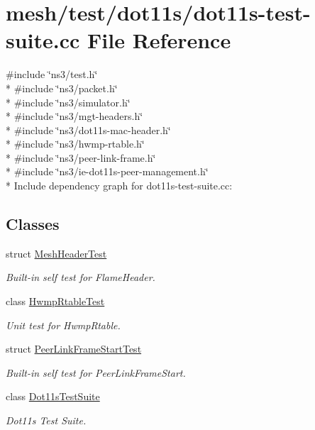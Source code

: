 \hypertarget{dot11s-test-suite_8cc}{}\section{mesh/test/dot11s/dot11s-\/test-\/suite.cc File Reference}
\label{dot11s-test-suite_8cc}
{\ttfamily \#include \char`\"{}ns3/test.\+h\char`\"{}}\\*
{\ttfamily \#include \char`\"{}ns3/packet.\+h\char`\"{}}\\*
{\ttfamily \#include \char`\"{}ns3/simulator.\+h\char`\"{}}\\*
{\ttfamily \#include \char`\"{}ns3/mgt-\/headers.\+h\char`\"{}}\\*
{\ttfamily \#include \char`\"{}ns3/dot11s-\/mac-\/header.\+h\char`\"{}}\\*
{\ttfamily \#include \char`\"{}ns3/hwmp-\/rtable.\+h\char`\"{}}\\*
{\ttfamily \#include \char`\"{}ns3/peer-\/link-\/frame.\+h\char`\"{}}\\*
{\ttfamily \#include \char`\"{}ns3/ie-\/dot11s-\/peer-\/management.\+h\char`\"{}}\\*
Include dependency graph for dot11s-\/test-\/suite.cc\+:
\subsection*{Classes}
\begin{DoxyCompactItemize}
\item 
struct \hyperlink{structMeshHeaderTest}{Mesh\+Header\+Test}
\begin{DoxyCompactList}\small\item\em Built-\/in self test for Flame\+Header. \end{DoxyCompactList}\item 
class \hyperlink{classHwmpRtableTest}{Hwmp\+Rtable\+Test}
\begin{DoxyCompactList}\small\item\em Unit test for Hwmp\+Rtable. \end{DoxyCompactList}\item 
struct \hyperlink{structPeerLinkFrameStartTest}{Peer\+Link\+Frame\+Start\+Test}
\begin{DoxyCompactList}\small\item\em Built-\/in self test for Peer\+Link\+Frame\+Start. \end{DoxyCompactList}\item 
class \hyperlink{classDot11sTestSuite}{Dot11s\+Test\+Suite}
\begin{DoxyCompactList}\small\item\em Dot11s Test Suite. \end{DoxyCompactList}\end{DoxyCompactItemize}
